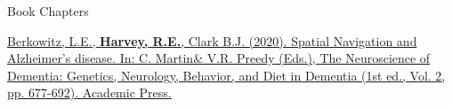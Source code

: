 \begin{cventries}
\cventry
    {Book Chapters} %
    {} %
    {} %
    {} %
    {
      \begin{cvitems} %
      \setlength\itemsep{0.5em}
          \item {\href{https://doi.org/10.1016/B978-0-12-815868-5.00043-8}{Berkowitz, L.E., \textbf{Harvey, R.E.}, Clark B.J. (2020). Spatial Navigation and Alzheimer’s disease. In: C. Martin\& V.R. Preedy (Eds.), The Neuroscience of Dementia: Genetics, Neurology, Behavior, and Diet in Dementia (1st ed., Vol. 2, pp. 677-692). Academic Press.}}
      \end{cvitems}
    }
\end{cventries}